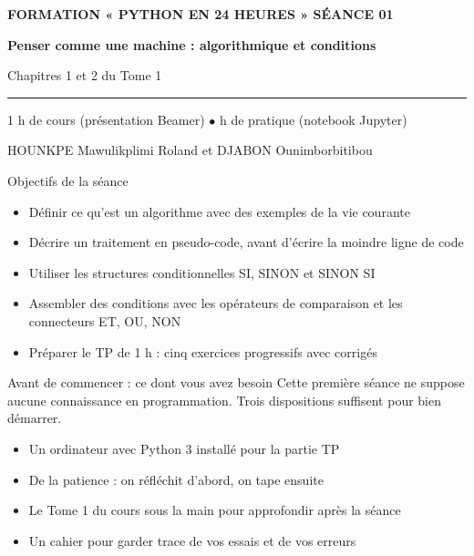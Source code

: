 \documentclass[aspectratio=169,11pt]{beamer}
\begin{document}
{%
\begin{frame}[plain]
\vspace{10mm}
{\color{PyJaune}\small\bfseries FORMATION « PYTHON EN 24 HEURES » \quad\textbar\quad SÉANCE 01\par}
\vspace{4mm}
{\color{white}\Huge\bfseries Penser comme une machine : algorithmique et conditions\par}
\vspace{4mm}
{\color{PyBleuClair}\large Chapitres 1 et 2 du Tome 1\par}
\vspace{7mm}
{\color{PyJaune}\rule{34mm}{2.2pt}\par}
\vspace{7mm}
{\color{white}\normalsize 1 h de cours (présentation Beamer) \quad$\bullet$ h de pratique (notebook Jupyter)\par}
\vspace{2.5mm}
{\color{PyBleuClair}\normalsize HOUNKPE Mawulikplimi Roland et DJABON Ounimborbitibou\par}
\end{frame}
}
\begin{frame}{Objectifs de la séance}
\begin{itemize}
  \item Définir ce qu'est un algorithme avec des exemples de la vie courante
  \item Décrire un traitement en pseudo-code, avant d'écrire la moindre ligne de code
  \item Utiliser les structures conditionnelles SI, SINON et SINON SI
  \item Assembler des conditions avec les opérateurs de comparaison et les connecteurs ET, OU, NON
  \item Préparer le TP de 1 h : cinq exercices progressifs avec corrigés
\end{itemize}
\end{frame}
\begin{frame}{Avant de commencer : ce dont vous avez besoin}
Cette première séance ne suppose aucune connaissance en programmation. Trois dispositions suffisent pour bien démarrer.

\begin{itemize}
  \item Un ordinateur avec Python 3 installé pour la partie TP
  \item De la patience : on réfléchit d'abord, on tape ensuite
  \item Le Tome 1 du cours sous la main pour approfondir après la séance
  \item Un cahier pour garder trace de vos essais et de vos erreurs
\end{itemize}
\end{frame}
\end{document}
